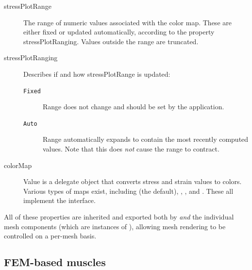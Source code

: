 \begin{description}

\item[stressPlotRange]\mbox{}

The range of numeric values associated with the color map. These are
either fixed or updated automatically, according to the property {\sf
stressPlotRanging}.  Values outside the range are truncated.

\item[stressPlotRanging]\mbox{}

Describes if and how {\sf stressPlotRange} is updated:

\begin{description}

\item[{\tt Fixed}]\mbox{}

Range does not change and should be set by the application.

\item[{\tt Auto}]\mbox{}

Range automatically expands to contain the most recently computed
values. Note that this does {\it not} cause the range to contract.

\end{description}

\item[colorMap]\mbox{}

Value is a delegate object that converts stress and strain values to
colors. Various types of maps exist, including
 (the default),
,
, and
.  These all implement the
 interface.

\end{description}

All of these properties are inherited and exported both by
 {\it and} the individual mesh components (which are
instances of ), allowing mesh rendering
to be controlled on a per-mesh basis.



\subsection{FEM-based muscles}

